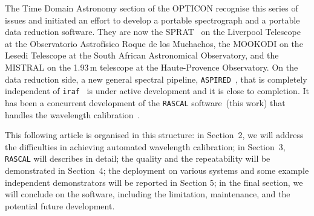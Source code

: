 \documentclass{aa}
\begin{document}
The Time Domain Astronomy section of the OPTICON recognise this series of issues and
initiated an effort to develop a portable spectrograph and a portable data reduction
software. They are now the SPRAT~\citep{2014SPIE.9147E..8HP} on the Liverpool
Telescope~\citep{2004SPIE.5489..679S} at the Observatorio Astrof{\'i}sico Roque de los
Muchachos, the MOOKODI on the Lesedi Telescope 
at the South African Astronomical Observatory, and the MISTRAL on the 1.93\,m
telescope at the Haute-Provence Observatory. On the data reduction side, a new
general spectral pipeline, \texttt{ASPIRED}~\citep{2020arXiv201203505L, 2020zndo...4306065L},
that is completely independent of \texttt{iraf}~\citep{1986SPIE..627..733T} is under
active development and it is close to completion. It has been a concurrent development
of the \texttt{RASCAL} software~(this work) that handles the wavelength
calibration~\citep{2019arXiv191205883V, 2020zndo...4117517V}.

This following article is organised in this structure: in Section~2, we will address
the difficulties in achieving automated wavelength calibration; in Section~3,
\texttt{RASCAL} will describes in detail; the quality and the repeatability will
be demonstrated in Section~4; the deployment on various systems and some example
independent demonstrators will be reported in Section 5; in the final section, we
will conclude on the software, including the limitation, maintenance, and the potential
future development.
\end{document}
